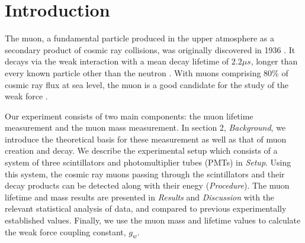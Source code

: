
\section{Introduction}\label{introduction}

The muon, a fundamental particle produced in the upper atmosphere as a
secondary product of cosmic ray collisions, was originally discovered
in 1936 \cite{}. It decays via the weak interaction with a mean decay
lifetime of $2.2 \mu s$, longer than every known particle other than
the neutron \cite{}. With muons comprising $80$\% of cosmic ray flux at
sea level, the muon is a good candidate for the study of the weak
force \cite{}.

Our experiment consists of two main components: the muon lifetime
measurement and the muon mass measurement. In section 2,
\emph{Background}, we introduce the theoretical basis for these
measurement as well as that of muon creation and decay. We describe
the experimental setup which consists of a system of three
scintillators and photomultiplier tubes (PMTs) in \emph{Setup}. Using
this system, the cosmic ray muons passing through the scintillators
and their decay products can be detected along with their enegy
(\emph{Procedure}). The muon lifetime and mass results are presented in
\emph{Results} and \emph{Discussion} with the relevant statistical
analysis of data, and compared to previous experimentally established
values. Finally, we use the muon mass and lifetime values to calculate
the weak force coupling constant, $g_w$.
